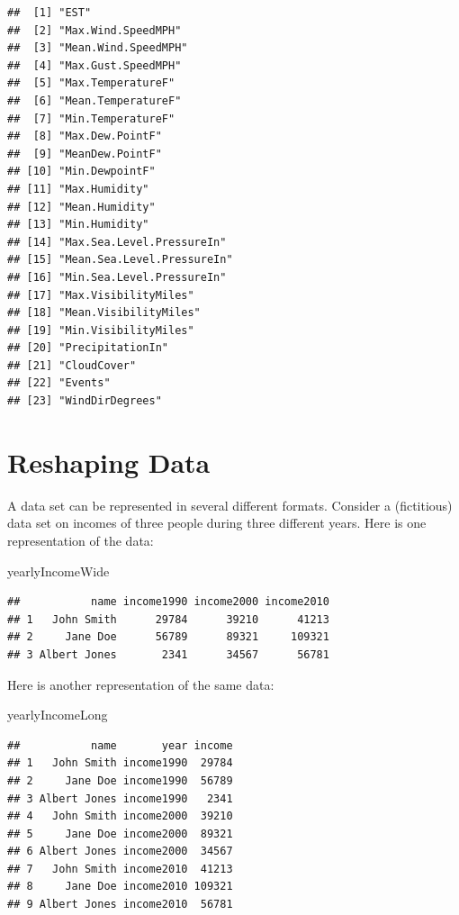 \documentclass[
]{krantz}
\newenvironment{Shaded}{\begin{snugshade}}{\end{snugshade}}
\newcommand{\NormalTok}[1]{#1}
\begin{document}
\begin{verbatim}
##  [1] "EST"                      
##  [2] "Max.Wind.SpeedMPH"        
##  [3] "Mean.Wind.SpeedMPH"       
##  [4] "Max.Gust.SpeedMPH"        
##  [5] "Max.TemperatureF"         
##  [6] "Mean.TemperatureF"        
##  [7] "Min.TemperatureF"         
##  [8] "Max.Dew.PointF"           
##  [9] "MeanDew.PointF"           
## [10] "Min.DewpointF"            
## [11] "Max.Humidity"             
## [12] "Mean.Humidity"            
## [13] "Min.Humidity"             
## [14] "Max.Sea.Level.PressureIn" 
## [15] "Mean.Sea.Level.PressureIn"
## [16] "Min.Sea.Level.PressureIn" 
## [17] "Max.VisibilityMiles"      
## [18] "Mean.VisibilityMiles"     
## [19] "Min.VisibilityMiles"      
## [20] "PrecipitationIn"          
## [21] "CloudCover"               
## [22] "Events"                   
## [23] "WindDirDegrees"
\end{verbatim}

\hypertarget{reshaping-data}{%
\section{Reshaping Data}\label{reshaping-data}}

A data set can be represented in several different formats. Consider a (fictitious) data set on incomes of three people during three different years. Here is one representation of the data:

\begin{Shaded}
\begin{Highlighting}[]
\NormalTok{yearlyIncomeWide}
\end{Highlighting}
\end{Shaded}

\begin{verbatim}
##           name income1990 income2000 income2010
## 1   John Smith      29784      39210      41213
## 2     Jane Doe      56789      89321     109321
## 3 Albert Jones       2341      34567      56781
\end{verbatim}

Here is another representation of the same data:

\begin{Shaded}
\begin{Highlighting}[]
\NormalTok{yearlyIncomeLong}
\end{Highlighting}
\end{Shaded}

\begin{verbatim}
##           name       year income
## 1   John Smith income1990  29784
## 2     Jane Doe income1990  56789
## 3 Albert Jones income1990   2341
## 4   John Smith income2000  39210
## 5     Jane Doe income2000  89321
## 6 Albert Jones income2000  34567
## 7   John Smith income2010  41213
## 8     Jane Doe income2010 109321
## 9 Albert Jones income2010  56781
\end{verbatim}
\end{document}

